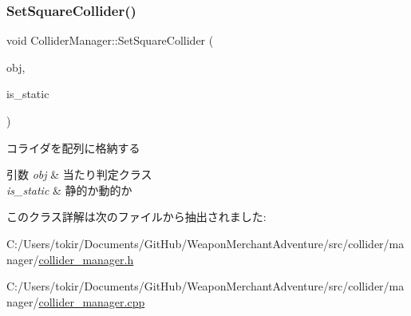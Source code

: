 \subsubsection{\texorpdfstring{Set\+Square\+Collider()}{SetSquareCollider()}}
{\footnotesize\ttfamily void Collider\+Manager\+::\+Set\+Square\+Collider (\begin{DoxyParamCaption}\item[{\mbox{\hyperlink{class_square_collider}{Square\+Collider}} $\ast$}]{obj,  }\item[{bool}]{is\+\_\+static }\end{DoxyParamCaption})}



コライダを配列に格納する 


\begin{DoxyParams}{引数}
{\em obj} & 当たり判定クラス \\
\hline
{\em is\+\_\+static} & 静的か動的か \\
\hline
\end{DoxyParams}


このクラス詳解は次のファイルから抽出されました\+:\begin{DoxyCompactItemize}
\item 
C\+:/\+Users/tokir/\+Documents/\+Git\+Hub/\+Weapon\+Merchant\+Adventure/src/collider/manager/\mbox{\hyperlink{collider__manager_8h}{collider\+\_\+manager.\+h}}\item 
C\+:/\+Users/tokir/\+Documents/\+Git\+Hub/\+Weapon\+Merchant\+Adventure/src/collider/manager/\mbox{\hyperlink{collider__manager_8cpp}{collider\+\_\+manager.\+cpp}}\end{DoxyCompactItemize}
